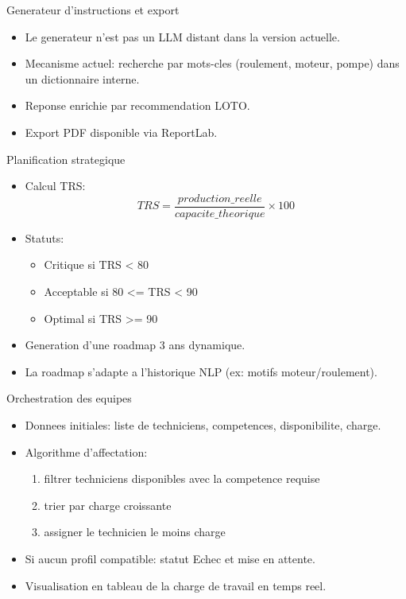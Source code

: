 \documentclass[10pt]{beamer}
\begin{document}
\begin{frame}{Generateur d'instructions et export}
\begin{itemize}
\item Le generateur n'est pas un LLM distant dans la version actuelle.
\item Mecanisme actuel: recherche par mots-cles (roulement, moteur, pompe) dans un dictionnaire interne.
\item Reponse enrichie par recommendation LOTO.
\item Export PDF disponible via ReportLab.
\end{itemize}
\end{frame}

\begin{frame}{Planification strategique}
\begin{itemize}
\item Calcul TRS:
\[
TRS = \frac{production\_reelle}{capacite\_theorique} \times 100
\]
\item Statuts:
\begin{itemize}
\item Critique si TRS < 80
\item Acceptable si 80 <= TRS < 90
\item Optimal si TRS >= 90
\end{itemize}
\item Generation d'une roadmap 3 ans dynamique.
\item La roadmap s'adapte a l'historique NLP (ex: motifs moteur/roulement).
\end{itemize}
\end{frame}

\begin{frame}{Orchestration des equipes}
\begin{itemize}
\item Donnees initiales: liste de techniciens, competences, disponibilite, charge.
\item Algorithme d'affectation:
\begin{enumerate}
\item filtrer techniciens disponibles avec la competence requise
\item trier par charge croissante
\item assigner le technicien le moins charge
\end{enumerate}
\item Si aucun profil compatible: statut Echec et mise en attente.
\item Visualisation en tableau de la charge de travail en temps reel.
\end{itemize}
\end{frame}
\end{document}
